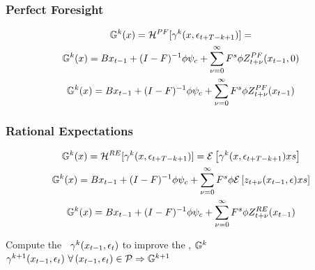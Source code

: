 \documentclass[tikz]{beamer}
\begin{document}
\begin{frame}
\frametitle{Perfect Foresight}




\begin{gather}
{\mathbb{G}}^{k}(x)=     \mathcal{H}^{PF}[{{\gamma}}^{k}(x,\epsilon_{t+T-k+1})]=\\
{\mathbb{G}}^{k}(x)={ B x_{t-1}+ (I - F)^{-1} \phi \psi_c } +   { \sum_{{\nu}=0}^\infty F^s \phi Z^{PF}_{t+{\nu}}(x_{t-1},0) }\\
 {\mathbb{G}}^{k}(x)={ B x_{t-1}+ (I - F)^{-1} \phi \psi_c } + { \sum_{{\nu}=0}^\infty F^s \phi {Z^{PF}_{t+{\nu}}(x_{t-1})} }
\end{gather}

\end{frame}
\begin{frame}
  
 \frametitle{Rational Expectations}

 \begin{gather}
 {\mathbb{G}}^{k}(x)=     \mathcal{H}^{RE}[{{\gamma}}^{k}(x,\epsilon_{t+T-k+1})]=
 {\mathcal{E}\left [ {{\gamma}}^{k}(x,\epsilon_{t+T-k+1}) xs\right ]}\\
  {\mathbb{G}}^{k}(x)={ B x_{t-1}+ (I - F)^{-1} \phi \psi_c } + { \sum_{{\nu}=0}^\infty F^s \phi {\mathcal{E}\left [ z_{t+{\nu}}(x_{t-1},\epsilon) xs\right ]} }\\
 {\mathbb{G}}^{k}(x)={ B x_{t-1}+ (I - F)^{-1} \phi \psi_c } + { \sum_{{\nu}=0}^\infty F^s \phi {Z^{RE}_{t+{\nu}}(x_{t-1})} }
 \end{gather}

\end{frame}


\begin{frame}[fragile]

{\small
}

{\small
  \begin{algorithm}[H]{Compute the \ADR\ ${{\gamma}}^k({x_{t-1},\epsilon_t})$ to improve the \ADRUE, ${\mathbb{G}}^{k}$}\\
${{\gamma}}^{k+1}({x_{t-1},\epsilon_t})\,\,  \forall \, ({x_{t-1},\epsilon_t})\in {\mathcal{P}} \Rightarrow {\mathbb{G}}^{k+1} $\;

\end{algorithm}
}

\end{frame}
\end{document}
